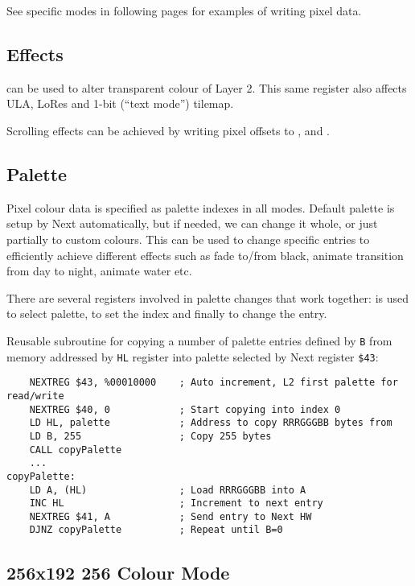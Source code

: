 \documentclass[12pt,twoside,openright,a4paper]{book}
\begin{document}
See specific modes in following pages for examples of writing pixel data.


\subsection{Effects}

 can be used to alter transparent colour of Layer 2. This same register also affects ULA, LoRes and 1-bit (``text mode'') tilemap.

Scrolling effects can be achieved by writing pixel offsets to ,  and .


\subsection{Palette}

Pixel colour data is specified as palette indexes in all modes. Default palette is setup by Next automatically, but if needed, we can change it whole, or just partially to custom colours. This can be used to change specific entries to efficiently achieve different effects such as fade to/from black, animate transition from day to night, animate water etc.

There are several registers involved in palette changes that work together:  is used to select palette,  to set the index and finally  to change the entry.

Reusable subroutine for copying a number of palette entries defined by {\tt B} from memory addressed by {\tt HL} register into palette selected by Next register {\tt \$43}:

\begin{Verbatim}
	NEXTREG $43, %00010000    ; Auto increment, L2 first palette for read/write
	NEXTREG $40, 0            ; Start copying into index 0
	LD HL, palette            ; Address to copy RRRGGGBB bytes from
	LD B, 255                 ; Copy 255 bytes
	CALL copyPalette
	...
copyPalette:
	LD A, (HL)                ; Load RRRGGGBB into A
	INC HL                    ; Increment to next entry
	NEXTREG $41, A            ; Send entry to Next HW
	DJNZ copyPalette          ; Repeat until B=0
\end{Verbatim}


\pagebreak
\subsection{256x192 256 Colour Mode}
\end{document}
